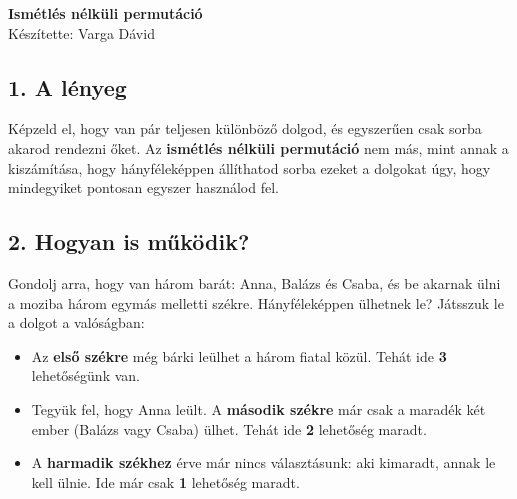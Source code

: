 \documentclass[11pt, a4paper]{article}
\begin{document}
\begin{center}
    \LARGE \textbf{Ismétlés nélküli permutáció} \\[0.3cm]
    \large Készítette: Varga Dávid \\
    \vspace{0.5cm}
\end{center}



\vspace{0.5cm}

\subsection*{1. A lényeg}
Képzeld el, hogy van pár teljesen különböző dolgod, és egyszerűen csak sorba akarod rendezni őket. Az \textbf{ismétlés nélküli permutáció} nem más, mint annak a kiszámítása, hogy hányféleképpen állíthatod sorba ezeket a dolgokat úgy, hogy mindegyiket pontosan egyszer használod fel.

\subsection*{2. Hogyan is működik?}
Gondolj arra, hogy van három barát: Anna, Balázs és Csaba, és be akarnak ülni a moziba három egymás melletti székre. Hányféleképpen ülhetnek le? Játsszuk le a dolgot a valóságban:
\begin{itemize}
    \item Az \textbf{első székre} még bárki leülhet a három fiatal közül. Tehát ide \textbf{3} lehetőségünk van.
    \item Tegyük fel, hogy Anna leült. A \textbf{második székre} már csak a maradék két ember (Balázs vagy Csaba) ülhet. Tehát ide \textbf{2} lehetőség maradt.
    \item A \textbf{harmadik székhez} érve már nincs választásunk: aki kimaradt, annak le kell ülnie. Ide már csak \textbf{1} lehetőség maradt.
\end{itemize}
\end{document}
